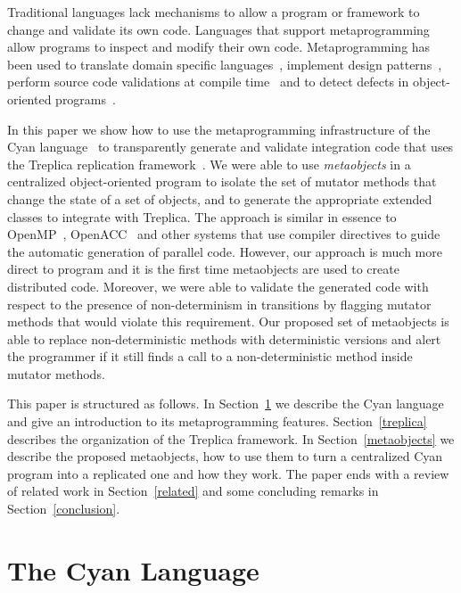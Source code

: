 \documentclass[preprint,review]{elsarticle}
\begin{document}
Traditional languages lack mechanisms to  allow a program or framework
to change and validate its own code. Languages
that support metaprogramming~\cite{damavsevivcius2015taxonomy}
allow programs to inspect and modify their own code. Metaprogramming
has      been     used      to      translate     domain      specific
languages~\cite{rentschler2014designing},       implement       design
patterns~\cite{blewitt2005automatic}, perform  source code validations
at compile  time~\cite{chlipala2013bedrock} and  to detect  defects in
object-oriented programs~\cite{mekruksavanich2012analytical}.

In this paper we show how to use the metaprogramming infrastructure of
the Cyan  language~\cite{guimaraes2013cyan} to  transparently generate
and  validate  integration code  that  uses  the Treplica  replication
framework~\cite{vieira08a}.  We were able to use \emph{metaobjects} in
a centralized  object-oriented program to  isolate the set  of mutator
methods that change the state of a set of objects, and to generate the
appropriate extended classes to integrate with Treplica.  The approach
is    similar    in    essence    to    OpenMP~\cite{dagum1998openmp},
OpenACC~\cite{wienke2012openacc} and  other systems that  use compiler
directives   to   guide   the   automatic   generation   of   parallel
code. However, our  approach is much more direct to  program and it is
the  first  time metaobjects  are  used  to create  distributed  code.
Moreover, we were able to validate  the generated code with respect to
the  presence of  non-determinism in  transitions by  flagging mutator
methods  that would  violate this  requirement.  Our  proposed set  of
metaobjects  is   able  to  replace  non-deterministic   methods  with
deterministic versions  and alert the  programmer if it still  finds a
call to a non-deterministic method inside mutator methods.

This  paper  is  structured  as  follows.   In  Section~\ref{cyan}  we
describe  the   Cyan  language  and   give  an  introduction   to  its
metaprogramming   features.    Section~\ref{treplica}  describes   the
organization of the  Treplica framework.  In Section~\ref{metaobjects}
we  describe the  proposed  metaobjects, how  to use  them  to turn  a
centralized Cyan program into a replicated one and how they work.  The
paper ends with a review  of related work in Section~\ref{related} and
some concluding remarks in Section~\ref{conclusion}.


\section{The Cyan Language}
\label{cyan}
\end{document}
